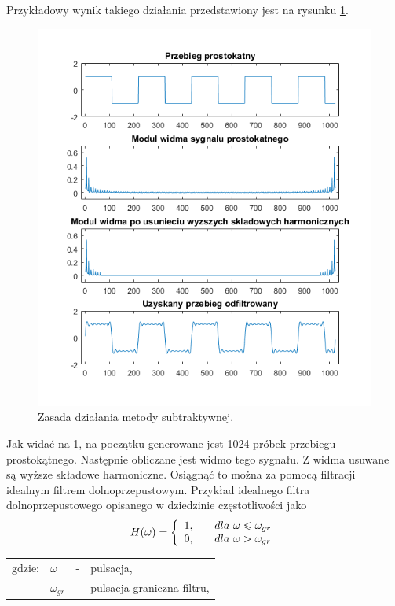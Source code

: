 Przykładowy wynik takiego działania przedstawiony jest na rysunku \ref{rys:sub_wykres1}.
\begin{figure}[H]
	\centering
	\includegraphics[width=12cm]{grafiki/sub_wykres1}
	\captionsetup{justification=centering}
	\caption{Zasada działania metody subtraktywnej.}
	\label{rys:sub_wykres1}
\end{figure}
Jak widać na \ref{rys:sub_wykres1}, na początku generowane jest 1024 próbek przebiegu prostokątnego. Następnie obliczane jest widmo tego sygnału. Z widma usuwane są wyższe składowe harmoniczne. Osiągnąć to można za pomocą filtracji idealnym filtrem dolnoprzepustowym. Przykład idealnego filtra dolnoprzepustowego opisanego w dziedzinie częstotliwości jako
\begin{equation} \label{equ:sub_lowpass}
H(\omega)=\left \{\begin{array}{ r l }
1, & \quad \text{$dla$ } \omega \leqslant \omega_{gr}\\
0, & \quad  \text{$dla$ } \omega > \omega_{gr}
\end{array}
\right.
\end{equation}
\begin{tabular}{ l l l l}
	gdzie: & $\omega$ &  - & pulsacja, \\
	&	$\omega_{gr}$ & - &  pulsacja graniczna filtru,\\
\end{tabular} \\ \\
